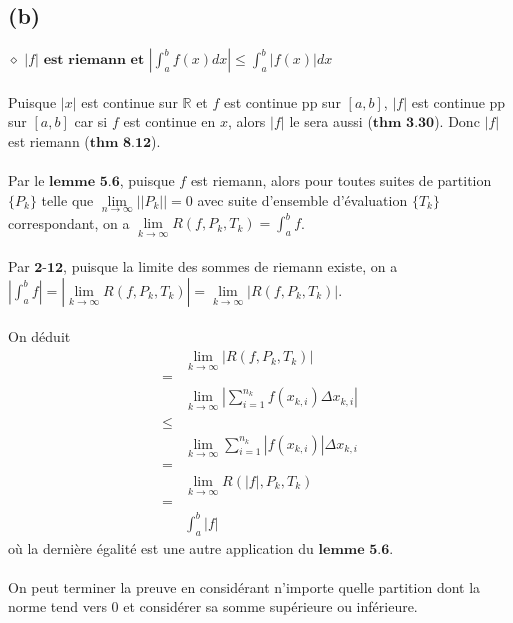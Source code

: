 \documentclass[a4paper,10pt]{article}
\begin{document}
\subsection*{(b)}
$\diamond$ $|f| \textbf{ est riemann et } \left|\int_a^b f(x)dx \right| \leq \int_a^b |f(x)| dx$
\\
\\
Puisque $|x|$ est continue sur $\mathbb{R}$ et $f$ est continue pp sur $[a,b]$, $|f|$ est continue pp sur $[a,b]$ car si
$f$ est continue en $x$, alors $|f|$ le sera aussi ($\textbf{thm 3.30}$). Donc $|f|$ est riemann ($\textbf{thm 8.12}$).
\\
\\
Par le $\textbf{lemme 5.6}$, puisque $f$ est riemann, alors pour toutes suites de partition $\{P_k\}$ telle que 
$\lim\limits_{n \to \infty} || P_k || = 0$ avec suite d'ensemble d'évaluation $\{T_k\}$ correspondant, on a 
$\lim\limits_{k \to \infty} R(f, P_k, T_k) = \int_a^b f$.
\\
\\
Par $\textbf{2-12}$, puisque la limite des sommes de riemann existe, on a $\left|\int_a^b f\right| = 
\left|\lim\limits_{k \to \infty} R(f, P_k, T_k)\right|
= \lim\limits_{k \to \infty} \left| R(f, P_k, T_k) \right|$.
\\
\\
On déduit
\begin{align*}
  & \lim\limits_{k \to \infty} \left| R(f, P_k, T_k) \right| \\
  = \\
  & \lim\limits_{k \to \infty} \left| \sum_{i = 1}^{n_k} f(x_{k,i}) \Delta x_{k,i} \right| \\
  \leq \\
  & \lim\limits_{k \to \infty} \sum_{i = 1}^{n_k} |f(x_{k,i})| \Delta x_{k,i} \\
  = \\
  & \lim\limits_{k \to \infty} R(|f|, P_k, T_k) \\
  = \\
  & \int_a^b |f|
\end{align*}
où la dernière égalité est une autre application du $\textbf{lemme 5.6}$.
\\
\\
On peut terminer la preuve en considérant n'importe quelle partition dont la norme tend vers 0 et considérer sa 
somme supérieure ou inférieure.
\end{document}
